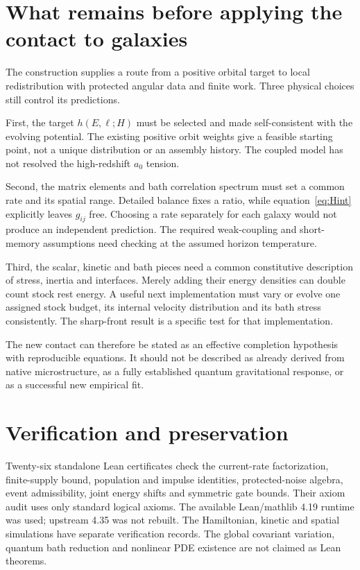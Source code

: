 \documentclass[11pt]{article}
\begin{document}
\section{What remains before applying the contact to galaxies}
The construction supplies a route from a positive orbital target to local
redistribution with protected angular data and finite work. Three physical
choices still control its predictions.

First, the target $h(E,\boldsymbol\ell;H)$ must be selected and made
self-consistent with the evolving potential. The existing positive orbit
weights give a feasible starting point, not a unique distribution or an
assembly history. The coupled model has not resolved the high-redshift
$a_0$ tension.

Second, the matrix elements and bath correlation spectrum must set a
common rate and its spatial range. Detailed balance fixes a ratio, while
equation~\eqref{eq:Hint} explicitly leaves $g_{ij}$ free. Choosing a rate
separately for each galaxy would not produce an independent prediction.
The required weak-coupling and short-memory assumptions need checking at
the assumed horizon temperature.

Third, the scalar, kinetic and bath pieces need a common constitutive
description of stress, inertia and interfaces. Merely adding their energy
densities can double count stock rest energy. A useful next implementation
must vary or evolve one assigned stock budget, its internal velocity
distribution and its bath stress consistently. The sharp-front result is
a specific test for that implementation.

The new contact can therefore be stated as an effective completion
hypothesis with reproducible equations. It should not be described as
already derived from native microstructure, as a fully established
quantum gravitational response, or as a successful new empirical fit.

\section{Verification and preservation}
Twenty-six standalone Lean certificates check the current-rate
factorization, finite-supply bound, population and impulse identities,
protected-noise algebra, event admissibility, joint energy shifts and
symmetric gate bounds. Their axiom audit uses only standard logical axioms.
The available Lean/mathlib 4.19 runtime was used; upstream 4.35 was not rebuilt.
The Hamiltonian, kinetic and spatial simulations have separate verification
records. The global covariant variation, quantum bath reduction and
nonlinear PDE existence are not claimed as Lean theorems.
\end{document}
